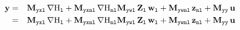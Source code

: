 \documentclass[10pt,a4paper]{article}
\begin{document}
\begin{eqnarray}
\vy & = &\M{yxl}\,\nabla \Hl + \M{yxnl}\,\nabla \Hnl\M{ywl}\,\mat Z_{\lab l}\,\vwl + \M{ywnl}\,\vznl + \M{yy}\,\vu\\
&=& \M{yxl}\,\nabla \Hl + \M{yxnl}\,\nabla \Hnl\M{ywl}\,\mat Z_{\lab l}\,\vwl + \M{ywnl}\,\vznl + \M{yy}\,\vu\\
\end{eqnarray}
\end{document}
